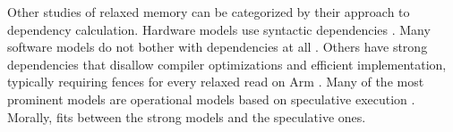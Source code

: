 Other studies of relaxed memory can be categorized by their approach to
dependency calculation.  Hardware models use syntactic dependencies
\cite{alglave}.  Many software models do not bother with dependencies at all
\cite{Batty:2011:MCC:1926385.1926394, DBLP:journals/pacmpl/WattRP19,
  DBLP:conf/pldi/WattPPBDFPG20, goMM}.  Others have strong dependencies that
disallow compiler optimizations and efficient implementation, typically
requiring fences for every relaxed read on Arm
\cite{Lamport:1979:MMC:1311099.1311750, DBLP:conf/pldi/LahavVKHD17,
  Dolan:2018:BDR:3192366.3192421, DBLP:conf/lics/JeffreyR16,
  Boehm:2014:OGA:2618128.2618134}. %
%
Many of the most prominent models are operational models based
on speculative execution \cite{Manson:2005:JMM:1047659.1040336,
  DBLP:conf/esop/JagadeesanPR10,
  DBLP:conf/popl/KangHLVD17,DBLP:journals/pacmpl/ChakrabortyV19,DBLP:conf/pldi/LeeCPCHLV20,promising-ldrf}.
Morally, \PwT{} fits between the strong models and the speculative ones.


